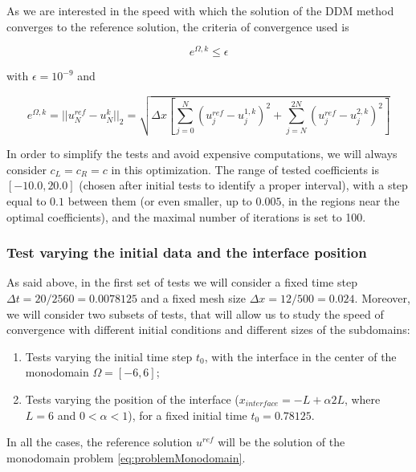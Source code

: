 \indent As we are interested in the speed with which the solution of the DDM method converges to the reference solution, the criteria of convergence used is

\begin{equation*}
\label{eq:criteriaConvergence}
	e^{\Omega,k} \leq \epsilon
\end{equation*}

\noindent with $\epsilon = 10^{-9}$ and 

\begin{equation*}
	e^{\Omega,k} = ||u^{ref}_N - u^{k}_N||_2 = \sqrt{\Delta x \left[ \sum_{j=0}^N{(u^{ref}_j - u^{1,k}_j)^2 } + \sum_{j=N}^{2N}{(u^{ref}_j - u^{2,k}_j)^2 } \right] }
\end{equation*}
 
\indent In order to simplify the tests and avoid expensive computations, we will always consider $c_L = c_R = c$ in this optimization. The range of tested coefficients is $[-10.0, 20.0]$ (chosen after initial tests to identify a proper interval), with a step equal to  $0.1$ between them (or even smaller, up to $0.005$, in the regions near the optimal coefficients), and the maximal number of iterations is set to 100.

\subsubsection{Test varying the initial data and the interface position}

\indent As said above, in the first set of tests we will consider a fixed time step $\Delta t = 20/2560 = 0.0078125$ and a fixed mesh size $\Delta x = 12/500 = 0.024$. Moreover, we will consider two subsets of tests, that will allow us to study the speed of convergence with different initial conditions and different sizes of the subdomains:

\begin{enumerate}
	\item Tests varying the initial time step $t_0$, with the interface in the center of the monodomain $\Omega = [-6,6]$;
	\item Tests varying the position of the interface ($x_{interface} = -L + \alpha 2L$, where $L = 6$ and $0 < \alpha < 1$), for a fixed initial time $t_0 = 0.78125$.
\end{enumerate}

\indent In all the cases, the reference solution $u^{ref}$ will be the solution of the monodomain problem \eqref{eq:problemMonodomain}.

